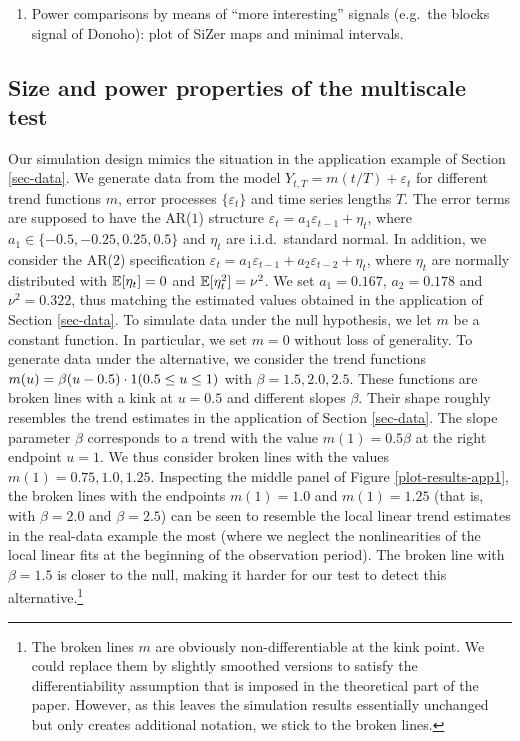 \begin{enumerate}[label=(\arabic*),leftmargin=0.7cm]
\begin{enumerate}[label=(\alph*),leftmargin=0.7cm]
\item Power comparisons by means of ``more interesting'' signals (e.g.\ the blocks signal of Donoho): plot of SiZer maps and minimal intervals. 


\end{enumerate}
\end{enumerate}

\FloatBarrier



\subsection{Size and power properties of the multiscale test}\label{subsec-sim-1} 


Our simulation design mimics the situation in the application example of Section \ref{sec-data}. We generate data from the model $Y_{t,T} = m(t/T) + \varepsilon_t$ for different trend functions $m$, error processes $\{\varepsilon_t\}$ and time series lengths $T$. The error terms are supposed to have the AR($1$) structure $\varepsilon_t = a_1 \varepsilon_{t-1} + \eta_t$, where $a_1 \in \{-0.5,-0.25,0.25,0.5\}$ and $\eta_t$ are i.i.d.\ standard normal. In addition, we consider the AR($2$) specification $\varepsilon_t = a_1 \varepsilon_{t-1} + a_2 \varepsilon_{t-2} + \eta_t$, where $\eta_t$ are normally distributed with $\mathbb{E}[\eta_t] = 0$ and $\mathbb{E}[\eta_t^2] = \nu^2$. We set $a_1 = 0.167$, $a_2 = 0.178$ and $\nu^2 = 0.322$, thus matching the estimated values obtained in the application of Section \ref{sec-data}. To simulate data under the null hypothesis, we let $m$ be a constant function. In particular, we set $m = 0$ without loss of generality. To generate data under the alternative, we consider the trend functions $m(u) = \beta (u - 0.5) \cdot 1(0.5 \le u \le 1)$ with $\beta = 1.5,2.0,2.5$. These functions are broken lines with a kink at $u = 0.5$ and different slopes $\beta$. Their shape roughly resembles the trend estimates in the application of Section \ref{sec-data}. The slope parameter $\beta$ corresponds to a trend with the value $m(1) = 0.5 \beta$ at the right endpoint $u = 1$. We thus consider broken lines with the values $m(1) = 0.75, 1.0, 1.25$. Inspecting the middle panel of Figure \ref{plot-results-app1}, the broken lines with the endpoints $m(1) = 1.0$ and $m(1) = 1.25$ (that is, with $\beta = 2.0$ and $\beta = 2.5$) can be seen to resemble the local linear trend estimates in the real-data example the most (where we neglect the nonlinearities of the local linear fits at the beginning of the observation period). The broken line with $\beta = 1.5$ is closer to the null, making it harder for our test to detect this alternative.\footnote{The broken lines $m$ are obviously non-differentiable at the kink point. We could replace them by slightly smoothed versions to satisfy the differentiability assumption that is imposed in the theoretical part of the paper. However, as this leaves the simulation results essentially unchanged but only creates additional notation, we stick to the broken lines.}


